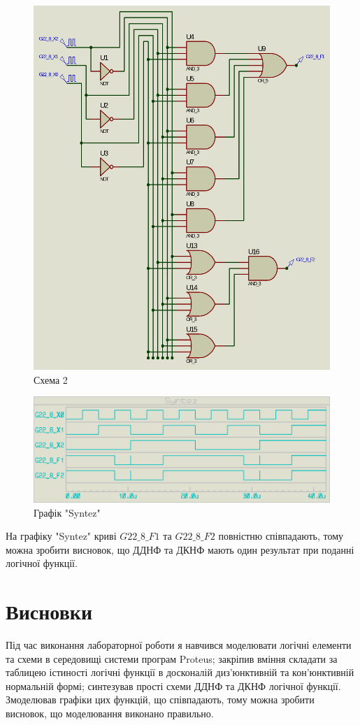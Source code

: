 \documentclass{article}
\begin{document}
\begin{normalsize}
	\begin{figure}[H]
		\centering
		\includegraphics[scale=0.29]{s2}	
		\caption{Схема 2}
	\end{figure}
	\begin{figure}[H]
		\centering
		\includegraphics[scale=0.35]{g4}	
		\caption{Графік "Syntez"}
	\end{figure}	

	На графіку "Syntez" криві $G22\_8\_F1$ та $G22\_8\_F2$ повністню співпадають, тому можна зробити висновок, що ДДНФ та ДКНФ мають один результат при поданні логічної функції.

	\section*{Висновки}
	Під час виконання лабораторної роботи я навчився моделювати логічні елементи та схеми в середовищі системи програм Proteus; закріпив вміння складати за таблицею істиності логічні функції в досконалій диз'юнктивній та кон'юнктивній нормальній формі; синтезував прості схеми ДДНФ та ДКНФ логічної функції. Змоделював графіки цих функцій, що співпадають, тому можна зробити висновок, що моделювання виконано правильно.
	    
\end{normalsize}
\end{document}
